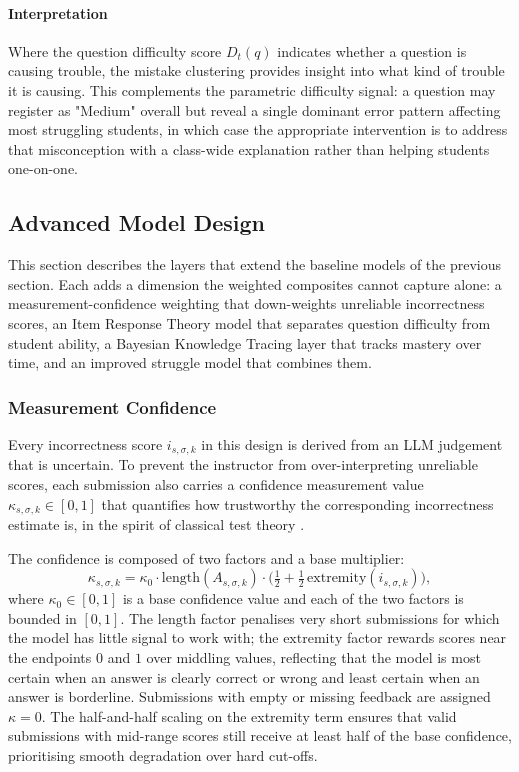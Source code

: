 \paragraph{Interpretation}
Where the question difficulty score $D_t(q)$ indicates whether a question is causing trouble, the mistake clustering provides insight into what kind of trouble it is causing. 
This complements the parametric difficulty signal: a question may register as "Medium" overall but reveal a single dominant error pattern affecting most struggling students, in which case the appropriate intervention is to address that misconception with a class-wide explanation rather than helping students one-on-one.

\subsection{Advanced Model Design}

This section describes the layers that extend the baseline models of the previous section. Each adds a dimension the weighted composites cannot capture alone: a measurement-confidence weighting that down-weights unreliable incorrectness scores, an Item Response Theory model that separates question difficulty from student ability, a Bayesian Knowledge Tracing layer that tracks mastery over time, and an improved struggle model that combines them.

\subsubsection{Measurement Confidence} \label{sec: measurement confidence}

Every incorrectness score $i_{s,\sigma,k}$ in this design is derived from an LLM judgement that is uncertain. To prevent the instructor from over-interpreting unreliable scores, each submission also carries a confidence measurement value $\kappa_{s,\sigma,k} \in [0,1]$ that quantifies how trustworthy the corresponding incorrectness estimate is, in the spirit of classical test theory \cite{lord1968statistical}.

The confidence is composed of two factors and a base multiplier:
\begin{equation}
    \kappa_{s,\sigma,k}
    = \kappa_0 \cdot \mathrm{length}(A_{s,\sigma,k}) \cdot \Big(\tfrac{1}{2} + \tfrac{1}{2}\,\mathrm{extremity}(i_{s,\sigma,k})\Big),
    \label{eq:measurement-confidence}
\end{equation}
where $\kappa_0 \in [0,1]$ is a base confidence value and each of the two factors is bounded in $[0,1]$. The $\mathrm{length}$ factor penalises very short submissions for which the model has little signal to work with; the $\mathrm{extremity}$ factor rewards scores near the endpoints $0$ and $1$ over middling values, reflecting that the model is most certain when an answer is clearly correct or wrong and least certain when an answer is borderline. Submissions with empty or missing feedback are assigned $\kappa = 0$. The half-and-half scaling on the extremity term ensures that valid submissions with mid-range scores still receive at least half of the base confidence, prioritising smooth degradation over hard cut-offs.


